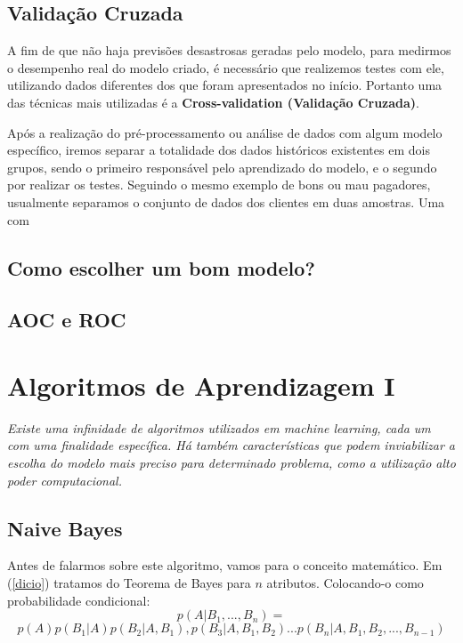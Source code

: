 \documentclass[
  openany]{book}
\begin{document}
\hypertarget{validauxe7uxe3o-cruzada}{%
\section{Validação Cruzada}\label{validauxe7uxe3o-cruzada}}

A fim de que não haja previsões desastrosas geradas pelo modelo, para medirmos o desempenho real do modelo criado, é necessário que realizemos testes com ele, utilizando dados diferentes dos que foram apresentados no início. Portanto uma das técnicas mais utilizadas é a \textbf{Cross-validation (Validação Cruzada)}.

Após a realização do pré-processamento ou análise de dados com algum modelo específico, iremos separar a totalidade dos dados históricos existentes em dois grupos, sendo o primeiro responsável pelo aprendizado do modelo, e o segundo por realizar os testes.
Seguindo o mesmo exemplo de bons ou mau pagadores, usualmente separamos o conjunto de dados dos clientes em duas amostras. Uma com

\hypertarget{como-escolher-um-bom-modelo}{%
\section{Como escolher um bom modelo?}\label{como-escolher-um-bom-modelo}}

\hypertarget{aocroc}{%
\section{AOC e ROC}\label{aocroc}}

\hypertarget{Algoritmosaprendizagem}{%
\chapter{Algoritmos de Aprendizagem I}\label{Algoritmosaprendizagem}}

\emph{Existe uma infinidade de algoritmos utilizados em machine learning, cada um com uma finalidade específica. Há também características que podem inviabilizar a escolha do modelo mais preciso para determinado problema, como a utilização alto poder computacional.}

\hypertarget{naive-bayes}{%
\section{Naive Bayes}\label{naive-bayes}}

Antes de falarmos sobre este algoritmo, vamos para o conceito matemático. Em (\ref{dicio}) tratamos do Teorema de Bayes para \(n\) atributos. Colocando-o como probabilidade condicional:
\[p(A|B_{1},...,B_{n}) = \]
\begin{equation} 
  p(A)p(B_{1}|A)p(B_{2}|A,B_{1}),p(B_{3}|A,B_{1},B_{2})...p(B_{n}|A,B_{1},B_{2},...,B_{n−1})
  \label{eq:bayescond}
\end{equation}
\end{document}
